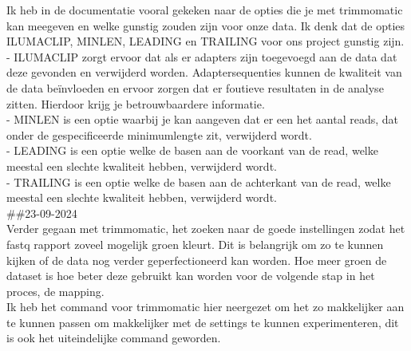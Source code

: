 \documentclass[
]{article}
\begin{document}
Ik heb in de documentatie vooral gekeken naar de opties die je met
trimmomatic kan meegeven en welke gunstig zouden zijn voor onze data. Ik
denk dat de opties ILUMACLIP, MINLEN, LEADING en TRAILING voor ons
project gunstig zijn.\\
- ILUMACLIP zorgt ervoor dat als er adapters zijn toegevoegd aan de data
dat deze gevonden en verwijderd worden. Adaptersequenties kunnen de
kwaliteit van de data beïnvloeden en ervoor zorgen dat er foutieve
resultaten in de analyse zitten. Hierdoor krijg je betrouwbaardere
informatie.\\
- MINLEN is een optie waarbij je kan aangeven dat er een het aantal
reads, dat onder de gespecificeerde minimumlengte zit, verwijderd
wordt.\\
- LEADING is een optie welke de basen aan de voorkant van de read, welke
meestal een slechte kwaliteit hebben, verwijderd wordt.\\
- TRAILING is een optie welke de basen aan de achterkant van de read,
welke meestal een slechte kwaliteit hebben, verwijderd wordt.\\

\#\#23-09-2024\\
Verder gegaan met trimmomatic, het zoeken naar de goede instellingen
zodat het fastq rapport zoveel mogelijk groen kleurt. Dit is belangrijk
om zo te kunnen kijken of de data nog verder geperfectioneerd kan
worden. Hoe meer groen de dataset is hoe beter deze gebruikt kan worden
voor de volgende stap in het proces, de mapping.\\

Ik heb het command voor trimmomatic hier neergezet om het zo makkelijker
aan te kunnen passen om makkelijker met de settings te kunnen
experimenteren, dit is ook het uiteindelijke command geworden.\\
\end{document}
